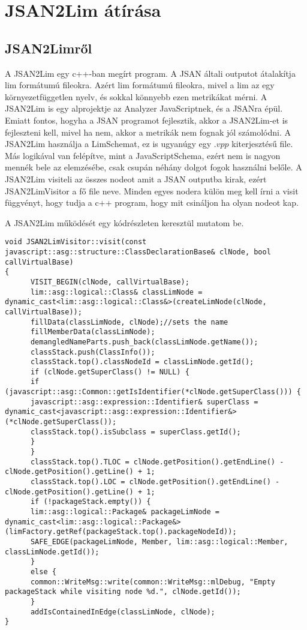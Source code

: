 \chapter{JSAN2Lim átírása}\label{chap:JSAN2Lim átírása}

\section{JSAN2Limről}

\noindent

A JSAN2Lim egy c++-ban megírt program. A JSAN általi outputot átalakítja lim formátumú fileokra.
Azért lim formátumú fileokra, mivel a lim az egy környezetfüggetlen nyelv, és sokkal könnyebb ezen metrikákat mérni.
A JSAN2Lim is egy alprojektje az Analyzer JavaScriptnek, és a JSANra épül.
Emiatt fontos, hogyha a JSAN programot fejlesztik, akkor a JSAN2Lim-et is fejleszteni kell, mivel ha nem, akkor a metrikák nem fognak jól számolódni.
A JSAN2Lim használja a LimSchemat, ez is ugyanúgy egy $.vpp$ kiterjesztésű file.
Más logikával van felépítve, mint a JavaScriptSchema, ezért nem is nagyon mennék bele az elemzésébe, csak csupán néhány dolgot fogok használni belőle.
A JSAN2Lim visiteli az összes nodeot amit a JSAN outputba kirak, ezért JSAN2LimVisitor a fő file neve.
Minden egyes nodera külön meg kell írni a visit függvényt, hogy tudja a c++ program, hogy mit csináljon ha olyan nodeot kap.

\noindent

A JSAN2Lim működését egy kódrészleten keresztül mutatom be.
\begin{lstlisting}[caption={ClassDeclaration Visitor}, label={lst:classdeclaration_visitor}, language={CStyle}]
void JSAN2LimVisitor::visit(const javascript::asg::structure::ClassDeclarationBase& clNode, bool callVirtualBase)
{
      VISIT_BEGIN(clNode, callVirtualBase);
      lim::asg::logical::Class& classLimNode = dynamic_cast<lim::asg::logical::Class&>(createLimNode(clNode, callVirtualBase));
      fillData(classLimNode, clNode);//sets the name
      fillMemberData(classLimNode);
      demangledNameParts.push_back(classLimNode.getName());
      classStack.push(ClassInfo());
      classStack.top().classNodeId = classLimNode.getId();
      if (clNode.getSuperClass() != NULL) {
      if (javascript::asg::Common::getIsIdentifier(*clNode.getSuperClass())) {
      javascript::asg::expression::Identifier& superClass = dynamic_cast<javascript::asg::expression::Identifier&>(*clNode.getSuperClass());
      classStack.top().isSubclass = superClass.getId();
      }
      }
      classStack.top().TLOC = clNode.getPosition().getEndLine() - clNode.getPosition().getLine() + 1;
      classStack.top().LOC = clNode.getPosition().getEndLine() - clNode.getPosition().getLine() + 1;
      if (!packageStack.empty()) {
      lim::asg::logical::Package& packageLimNode = dynamic_cast<lim::asg::logical::Package&>(limFactory.getRef(packageStack.top().packageNodeId));
      SAFE_EDGE(packageLimNode, Member, lim::asg::logical::Member, classLimNode.getId());
      }
      else {
      common::WriteMsg::write(common::WriteMsg::mlDebug, "Empty packageStack while visiting node %d.", clNode.getId());
      }
      addIsContainedInEdge(classLimNode, clNode);
}
\end{lstlisting}

